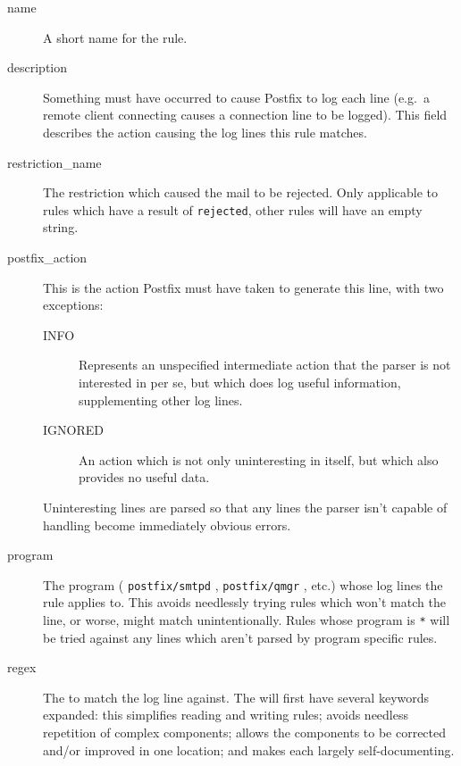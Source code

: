 \documentclass[a4paper,12pt,draft]{article}
\newcommand{\daemon}[1]{%
    \texttt{postfix/#1}%
}
\begin{document}
\begin{description}

    \item [name] A short name for the rule.

    \item [description] Something must have occurred to cause Postfix to
        log each line (e.g.\ a remote client connecting causes a connection
        line to be logged).  This field describes the action causing the
        log lines this rule matches.

    \item [restriction\_name] The restriction which caused the mail to be
        rejected.  Only applicable to rules which have a result of
        \texttt{rejected}, other rules will have an empty string.

    \item [postfix\_action] This is the action Postfix must have taken to
        generate this line, with two exceptions:

        \begin{description}

            \item [INFO] Represents an unspecified intermediate action that
                the parser is not interested in per se, but which does log
                useful information, supplementing other log lines.

            \item [IGNORED] An action which is not only uninteresting in
                itself, but which also provides no useful data.

        \end{description}

        Uninteresting lines are parsed so that any lines the parser isn't
        capable of handling become immediately obvious errors.

    \item [program] The program (\daemon{smtpd}, \daemon{qmgr}, etc.) whose
        log lines the rule applies to.  This avoids needlessly trying rules
        which won't match the line, or worse, might match unintentionally.
        Rules whose program is \texttt{*} will be tried against any lines
        which aren't parsed by program specific rules.

    \item [regex] The \regex{} to match the log line against.  The \regex{}
        will first have several keywords expanded: this simplifies reading
        and writing rules; avoids needless repetition of complex \regex{}
        components; allows the components to be corrected and/or improved
        in one location; and makes each \regex{} largely self-documenting.


\end{description}
\end{document}
